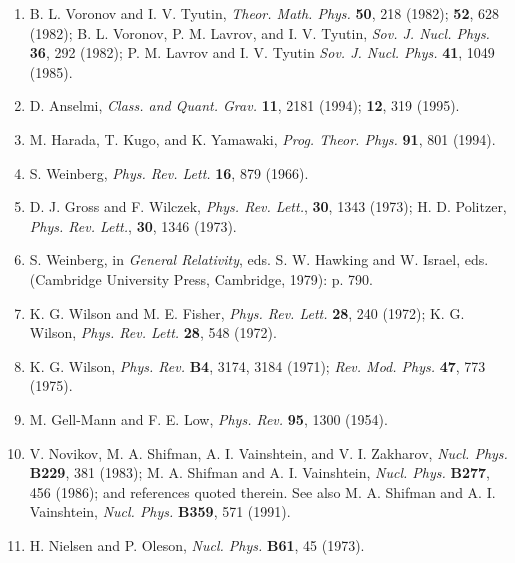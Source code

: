 \documentclass[12pt]{article}
\begin{document}
\begin{enumerate}
\item B. L. Voronov and I. V. Tyutin, {\it Theor. Math.
Phys.} {\bf 50}, 218 (1982); {\bf 52}, 628 (1982); B. L.
Voronov, P. M. Lavrov, and I. V. Tyutin, {\em Sov. J. Nucl.
Phys.} {\bf 36}, 292 (1982); P. M. Lavrov and I. V. Tyutin
{\it Sov. J. Nucl. Phys.} {\bf 41}, 1049 (1985).

\item D. Anselmi, {\em Class. and Quant. Grav.} {\bf 11},
2181 (1994); {\bf 12}, 319 (1995).

\item M. Harada, T. Kugo, and K. Yamawaki, {\em Prog. Theor.
Phys.} {\bf 91}, 801 (1994).

\item S. Weinberg, {\em Phys. Rev. Lett.} {\bf 16}, 879
(1966).


\item D. J. Gross and F. Wilczek, {\it Phys. Rev. Lett.},
{\bf 30}, 1343 (1973); H. D. Politzer, {\it Phys. Rev.
Lett.}, {\bf 30}, 1346 (1973).

\item S. Weinberg, in  {\it General Relativity},  eds. S. W.
Hawking and W. Israel, eds. (Cambridge University Press,
Cambridge, 1979): p. 790.

\item K. G. Wilson and M. E.  Fisher, {\it Phys. Rev. Lett.}
{\bf 28}, 240 (1972); K. G. Wilson, {\it Phys. Rev. Lett.}
{\bf 28}, 548 (1972).


\item K. G. Wilson, {\it Phys. Rev.} {\bf B4}, 3174, 3184
(1971); {\it Rev. Mod. Phys.} {\bf 47}, 773 (1975).

\item M. Gell-Mann and F. E.  Low, {\em Phys. Rev.} {\bf
95}, 1300 (1954).

\item V. Novikov, M. A. Shifman, A. I. Vainshtein, and V. I.
Zakharov, {\it Nucl. Phys.}  {\bf B229}, 381 (1983); M. A.
Shifman and  A. I. Vainshtein,  {\it Nucl. Phys.}  {\bf
B277}, 456 (1986); and references quoted therein.  See also
M. A. Shifman and  A. I. Vainshtein,  {\it Nucl. Phys.}
{\bf B359}, 571 (1991).

\item H. Nielsen and P. Oleson, {\em Nucl. Phys.} {\bf B61},
45 (1973).


\end{enumerate}
\end{document}
